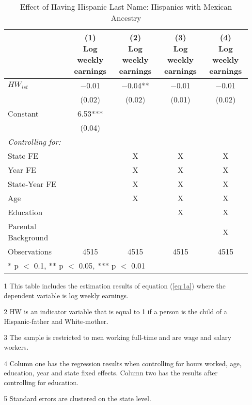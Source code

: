 \begin{table}[H]
\centering\centering
\caption{Effect of Having Hispanic Last Name: Hispanics with Mexican Ancestry  \label{tab:lastnamereg-weekearm-mex}}
\centering
\begin{threeparttable}
\begin{tabular}[t]{lcccc}
\toprule
  & \specialcell{(1) \\ Log weekly \\ earnings} & \specialcell{(2) \\ Log weekly \\ earnings} & \specialcell{(3) \\  Log weekly \\ earnings} & \specialcell{(4) \\  Log weekly \\ earnings}\\
\midrule
$HW_{ist}$ & \num{-0.01} & \num{-0.04}** & \num{-0.01} & \num{-0.01}\\
 & (\num{0.02}) & (\num{0.02}) & (\num{0.01}) & (\num{0.02})\\
Constant & \num{6.53}*** &  &  & \\
 & (\num{0.04}) &  &  & \\
\midrule
\textit{Controlling for:} &  &  &  & \\
State FE &  & X & X & X\\
Year FE &  & X & X & X\\
State-Year FE &  & X & X & X\\
Age &  & X & X & X\\
Education &  &  & X & X\\
Parental Background &  &  &  & X\\
Observations & \num{4515} & \num{4515} & \num{4515} & \num{4515}\\
\bottomrule
\multicolumn{5}{l}{\rule{0pt}{1em}* p $<$ 0.1, ** p $<$ 0.05, *** p $<$ 0.01}\\
\end{tabular}
\begin{tablenotes}
\item[1] {\footnotesize{This table includes the estimation results of equation (\ref{eq:1a}) where the dependent variable is log weekly earnings.}}
\item[2] {\footnotesize{HW is an indicator variable that is equal to 1 if a person is the child of a Hispanic-father and White-mother.}}
\item[3] {\footnotesize{The sample is restricted to men working full-time and are wage and salary workers.}}
\item[4] {\footnotesize{Column one has the regression results when controlling for hours worked, age, education, year and state fixed effects. Column two has the results after controlling for education.}}
\item[5] {\footnotesize{Standard errors are clustered on the state level.}}
\end{tablenotes}
\end{threeparttable}
\end{table}
